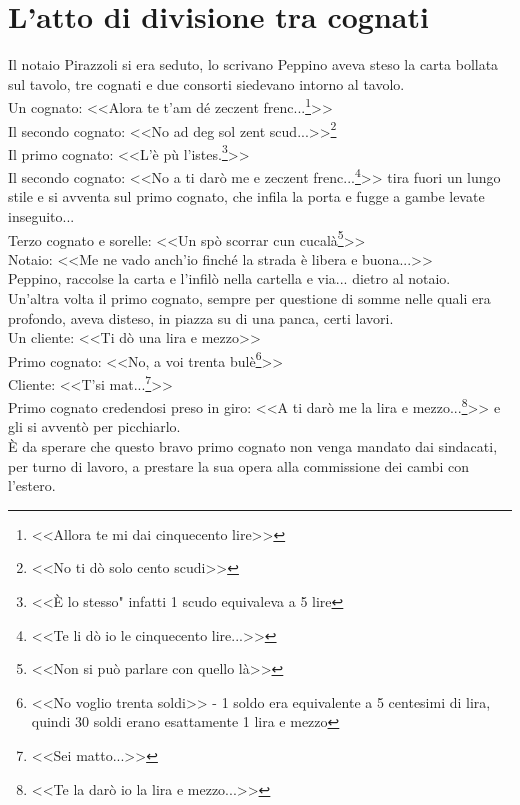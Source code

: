 
\chapter{L'atto di divisione tra cognati}
Il notaio Pirazzoli si era seduto, lo scrivano Peppino aveva steso la carta bollata sul tavolo, tre cognati e due consorti siedevano intorno al tavolo. \\
\indent Un cognato: <<Alora te t'am dé zeczent frenc...\footnote{<<Allora te mi dai cinquecento lire>>}>>\\
\indent Il secondo cognato: <<No ad deg sol zent scud...>>\footnote{<<No ti dò solo cento scudi>>}\\
\indent Il primo cognato: <<L'è pù l'istes.\footnote{<<È lo stesso" infatti 1 scudo equivaleva a 5 lire}>>\\
\indent Il secondo cognato: <<No a ti darò me e zeczent frenc...\footnote{<<Te li dò io le cinquecento lire...>>}>> tira fuori un lungo stile e si avventa sul primo cognato, che infila la porta e fugge a gambe levate inseguito...\\
\indent Terzo cognato e sorelle: <<Un spò scorrar cun cucalà\footnote{<<Non si può parlare con quello là>>}>>\\
\indent Notaio: <<Me ne vado anch'io finché la strada è libera e buona...>>\\
Peppino, raccolse la carta e l'infilò nella cartella e via... dietro al notaio.\\

\indent Un'altra volta il primo cognato, sempre per questione di somme nelle quali era profondo, aveva disteso, in piazza su di una panca, certi lavori.\\
\indent Un cliente: <<Ti dò una lira e mezzo>>\\
\indent Primo cognato: <<No, a voi trenta bulè\footnote{<<No voglio trenta soldi>> - 1 soldo era equivalente a 5 centesimi di lira, quindi 30 soldi erano esattamente 1 lira e mezzo}>>\\
\indent Cliente: <<T'si mat...\footnote{<<Sei matto...>>}>>\\
\indent Primo cognato credendosi preso in giro: <<A ti darò me la lira e mezzo...\footnote{<<Te la darò io la lira e mezzo...>>}>> e gli si avventò per picchiarlo.\\
\indent È da sperare che questo bravo primo cognato non venga mandato dai sindacati, per turno di lavoro, a prestare la sua opera alla commissione dei cambi con l'estero.\\

